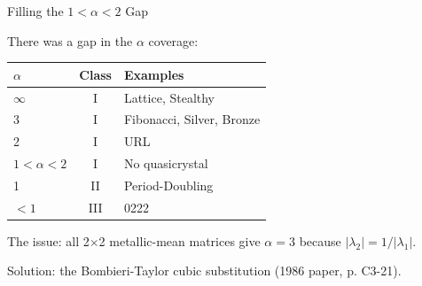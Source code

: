 \documentclass[aspectratio=169, 11pt]{beamer}
\begin{document}
\begin{frame}{Filling the $1 < \alpha < 2$ Gap}

There was a gap in the $\alpha$ coverage:

\vspace{0.3em}
\begin{center}
\begin{tabular}{lcl}
\toprule
$\alpha$ & Class & Examples \\
\midrule
$\infty$ & I & Lattice, Stealthy \\
3 & I & Fibonacci, Silver, Bronze \\
2 & I & URL \\
\rowcolor{yellow!30}
$1 < \alpha < 2$ & I & No quasicrystal \\
1 & II & Period-Doubling \\
$< 1$ & III & 0222 \\
\bottomrule
\end{tabular}
\end{center}

\vspace{0.5em}
The issue: all 2$\times$2 metallic-mean matrices give $\alpha = 3$ because $|\lambda_2| = 1/|\lambda_1|$.

\vspace{0.3em}
Solution: the Bombieri-Taylor cubic substitution (1986 paper, p. C3-21).
\end{frame}
\end{document}
